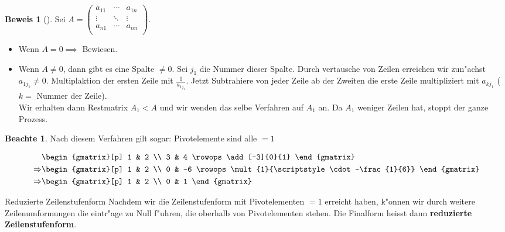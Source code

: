 \documentclass[oneside,fontsize=11pt,paper=a4,BCOR=0mm,DIV=12,automark,headsepline]{scrbook}
\theoremstyle{remark}
\theoremstyle{definition}
\newtheorem*{notte}{Beachte}
\theoremstyle{definition}
\newtheorem*{prof}{Beweis}
\theoremstyle{remark}
\begin{document}
\begin{prof}[]
  Sei \(A=
  \begin{pmatrix}
    a_{11} & \cdots & a_{1n} \\
    \vdots & \ddots & \vdots \\
    a_{n1} & \cdots & a_{nn} \\
    
  \end{pmatrix}\).
  \begin{itemize}
  \item Wenn \(A=0 \implies\) Bewiesen.
  \item Wenn \(A\not=0\), dann gibt es eine Spalte \(\not= 0\). Sei
    \(j_1\) die Nummer dieser Spalte. Durch vertausche von Zeilen erreichen wir
    zun"achst \(a_{1j_1}\not= 0\). Multiplaktion der ersten Zeile mit
    \(\frac{1}{a_{1j_1}}\). Jetzt Subtrahiere von jeder Zeile ab der Zweiten die erste
    Zeile multipliziert mit \(a_{kj_1}\) (\(k=\) Nummer der Zeile).\\
    
    Wir erhalten dann Restmatrix \(A_1<A\) und wir wenden das selbe Verfahren auf
    \(A_1\) an. Da \(A_1\) weniger Zeilen hat, stoppt der ganze Prozess.
  \end{itemize}
  \begin{notte}
    Nach diesem Verfahren gilt sogar: Pivotelemente sind alle \(=1\)
  \end{notte}
\end{prof}


\begin{exa}
  \begin{align*}
    & \begin{gmatrix}[p]
      1 & 2 \\
      3 & 4
      \rowops
      \add[-3]{0}{1}
    \end{gmatrix} \\
    \Rightarrow & \begin{gmatrix}[p]
      1 & 2 \\
      0 & -6
      \rowops
      \mult{1}{\scriptstyle\cdot-\frac{1}{6}}
    \end{gmatrix} \\
    \Rightarrow & \begin{gmatrix}[p]
      1 & 2 \\
      0 & 1
    \end{gmatrix}
  \end{align*}
\end{exa}

\begin{definition}{Reduzierte Zeilenstufenform}{}
  Nachdem wir die Zeilenstufenform mit Pivotelementen \(=1\) erreicht haben, k"onnen
  wir durch weitere Zeilenumformungen die eintr"age zu Null f"uhren, die oberhalb
  von Pivotelementen stehen. Die Finalform heisst dann \textbf{reduzierte
    Zeilenstufenform}.
\end{definition}
\end{document}
